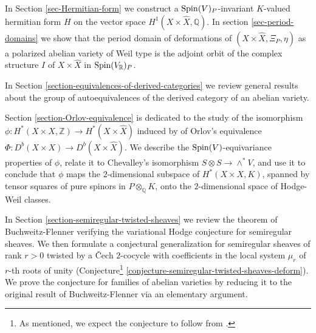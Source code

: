\documentclass[12pt]{amsart}
\numberwithin{equation}{subsection}
\theoremstyle{plain}
\theoremstyle{definition}
\newcommand{\QQ}{{\mathbb Q}}
\newcommand{\RR}{{\mathbb R}}
\newcommand{\ZZ}{{\mathbb Z}}
\newcommand{\Spin}{{\rm Spin}}
\begin{document}
In Section \ref{sec-Hermitian-form} we construct a $\Spin(V)_P$-invariant $K$-valued hermitian form $H$ 
on the vector space $H^1(X\times\hat{X},\QQ)$.
In section \ref{sec-period-domains} we show that the period domain of deformations of $(X\times\hat{X},\Xi_P,\eta)$ as a polarized abelian variety of Weil type is the adjoint orbit of the complex structure $I$ of $X\times\hat{X}$ in $\Spin(V_\RR)_P$.

In Section \ref{section-equivalences-of-derived-categories} we review general results about the group of autoequivalences of the derived category of an abelian variety. 

Section \ref{section-Orlov-equivalence} is dedicated to the study of the isomorphism 
$\phi:H^*(X\times X,\ZZ)\rightarrow H^*(X\times\hat{X})$ induced by of Orlov's equivalence $\Phi:D^b(X\times X)\rightarrow D^b(X\times\hat{X})$.
We describe the $\Spin(V)$-equivariance properties of $\phi$, relate it to Chevalley's  isomorphism $S\otimes S\rightarrow \wedge^*V$, and use it to conclude that  $\phi$ maps the $2$-dimensional subspace of $H^*(X\times X,K)$, spanned by tensor squares of pure spinors in $P\otimes_\QQ K$, onto 
the $2$-dimensional space of Hodge-Weil classes.

In Section \ref{section-semiregular-twisted-sheaves} we review the theorem of Buchweitz-Flenner verifying the variational Hodge conjecture for semiregular sheaves. We then formulate a conjectural generalization for semiregular sheaves of rank $r>0$ twisted by a \v{C}ech $2$-cocycle with coefficients in the local system  $\mu_r$ of $r$-th roots of unity (Conjecture\footnote{As mentioned, we expect the conjecture to follow from \cite[Remark 2.26]{pridham}.} 
\ref{conjecture-semiregular-twisted-sheaves-deform}).
We prove the conjecture for families of abelian varieties by reducing it to the original result of Buchweitz-Flenner via an elementary argument. 
\end{document}
